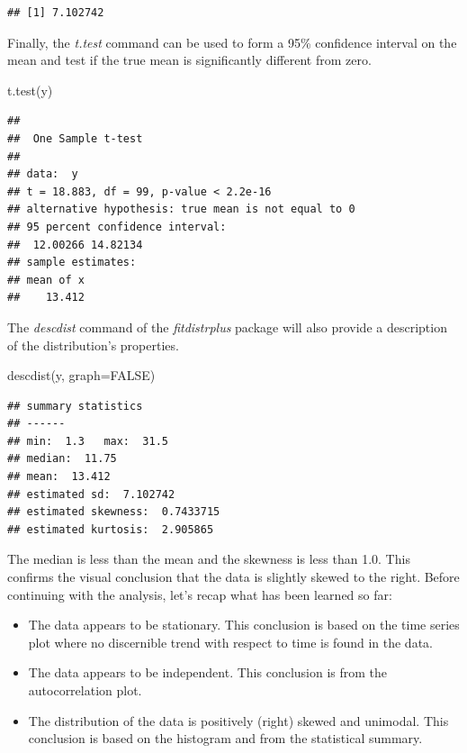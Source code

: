 \documentclass[
]{book}
\newenvironment{Shaded}{\begin{snugshade}}{\end{snugshade}}
\newcommand{\AttributeTok}[1]{\textcolor[rgb]{0.77,0.63,0.00}{#1}}
\newcommand{\ConstantTok}[1]{\textcolor[rgb]{0.00,0.00,0.00}{#1}}
\newcommand{\FunctionTok}[1]{\textcolor[rgb]{0.00,0.00,0.00}{#1}}
\newcommand{\NormalTok}[1]{#1}
\theoremstyle{definition}
\theoremstyle{definition}
\theoremstyle{definition}
\theoremstyle{definition}
\theoremstyle{remark}
\begin{document}
\begin{verbatim}
## [1] 7.102742
\end{verbatim}

Finally, the \emph{t.test} command can be used to form a 95\% confidence interval on the
mean and test if the true mean is significantly different from zero.

\begin{Shaded}
\begin{Highlighting}[]
\FunctionTok{t.test}\NormalTok{(y)}
\end{Highlighting}
\end{Shaded}

\begin{verbatim}
## 
##  One Sample t-test
## 
## data:  y
## t = 18.883, df = 99, p-value < 2.2e-16
## alternative hypothesis: true mean is not equal to 0
## 95 percent confidence interval:
##  12.00266 14.82134
## sample estimates:
## mean of x 
##    13.412
\end{verbatim}

The \emph{descdist} command of the \emph{fitdistrplus} package will also provide a
description of the distribution's properties.

\begin{Shaded}
\begin{Highlighting}[]
\FunctionTok{descdist}\NormalTok{(y, }\AttributeTok{graph=}\ConstantTok{FALSE}\NormalTok{)}
\end{Highlighting}
\end{Shaded}

\begin{verbatim}
## summary statistics
## ------
## min:  1.3   max:  31.5 
## median:  11.75 
## mean:  13.412 
## estimated sd:  7.102742 
## estimated skewness:  0.7433715 
## estimated kurtosis:  2.905865
\end{verbatim}

The median is less than the mean and the skewness is less than 1.0. This
confirms the visual conclusion that the data is slightly skewed to the
right. Before continuing with the analysis, let's recap what has been
learned so far:

\begin{itemize}
\item
  The data appears to be stationary. This conclusion is based on the
  time series plot where no discernible trend with respect to time is
  found in the data.
\item
  The data appears to be independent. This conclusion is from the
  autocorrelation plot.
\item
  The distribution of the data is positively (right) skewed and
  unimodal. This conclusion is based on the histogram and from the
  statistical summary.
\end{itemize}
\end{document}
